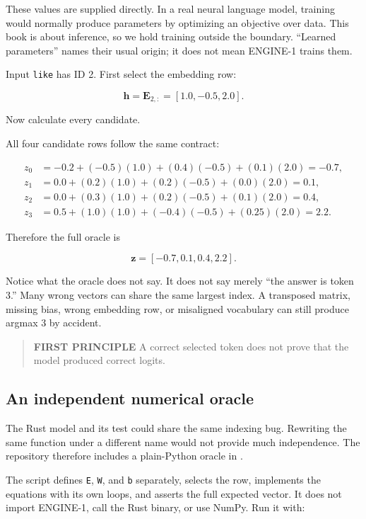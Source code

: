 \documentclass[
  10pt,
]{article}
\begin{document}
These values are supplied directly. In a real neural language model,
training would normally produce parameters by optimizing an objective
over data. This book is about inference, so we hold training outside the
boundary. ``Learned parameters'' names their usual origin; it does not
mean ENGINE-1 trains them.

Input \texttt{like} has ID 2. First select the embedding row:

\[
\mathbf{h}=\mathbf{E}_{2,:}=[1.0,-0.5,2.0].
\]

Now calculate every candidate.

All four candidate rows follow the same contract:

\[
\begin{aligned}
z_0&=-0.2+(-0.5)(1.0)+(0.4)(-0.5)+(0.1)(2.0)=-0.7,\\
z_1&= 0.0+(0.2)(1.0)+(0.2)(-0.5)+(0.0)(2.0)= 0.1,\\
z_2&= 0.0+(0.3)(1.0)+(0.2)(-0.5)+(0.1)(2.0)= 0.4,\\
z_3&= 0.5+(1.0)(1.0)+(-0.4)(-0.5)+(0.25)(2.0)=2.2.
\end{aligned}
\]

Therefore the full oracle is

\[
\mathbf{z}=[-0.7,0.1,0.4,2.2].
\]

Notice what the oracle does not say. It does not say merely ``the answer
is token 3.'' Many wrong vectors can share the same largest index. A
transposed matrix, missing bias, wrong embedding row, or misaligned
vocabulary can still produce argmax 3 by accident.

\begin{quote}
\textbf{FIRST PRINCIPLE} A correct selected token does not prove that
the model produced correct logits.
\end{quote}

\subsection{An independent numerical
oracle}\label{an-independent-numerical-oracle}

The Rust model and its test could share the same indexing bug. Rewriting
the same function under a different name would not provide much
independence. The repository therefore includes a plain-Python oracle in
\texttt{}.

The script defines \texttt{E}, \texttt{W}, and \texttt{b} separately,
selects the row, implements the equations with its own loops, and
asserts the full expected vector. It does not import ENGINE-1, call the
Rust binary, or use NumPy. Run it with:
\end{document}
